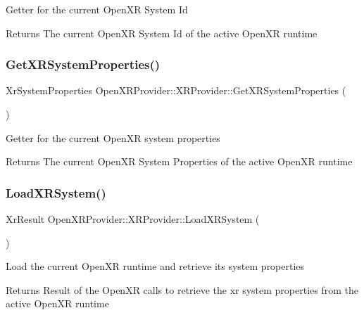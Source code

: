 Getter for the current Open\+XR System Id \begin{DoxyReturn}{Returns}
The current Open\+XR System Id of the active Open\+XR runtime 
\end{DoxyReturn}
\mbox{\label{class_open_x_r_provider_1_1_x_r_provider_aa5396c861be5f6a445095a8a346b62c9}} 
\subsubsection{\texorpdfstring{GetXRSystemProperties()}{GetXRSystemProperties()}}
{\footnotesize\ttfamily Xr\+System\+Properties Open\+X\+R\+Provider\+::\+X\+R\+Provider\+::\+Get\+X\+R\+System\+Properties (\begin{DoxyParamCaption}{ }\end{DoxyParamCaption})\hspace{0.3cm}{\ttfamily [inline]}}

Getter for the current Open\+XR system properties \begin{DoxyReturn}{Returns}
The current Open\+XR System Properties of the active Open\+XR runtime 
\end{DoxyReturn}
\mbox{\label{class_open_x_r_provider_1_1_x_r_provider_a1bd2735b39ea943cd9e436bb0650bc43}} 
\subsubsection{\texorpdfstring{LoadXRSystem()}{LoadXRSystem()}}
{\footnotesize\ttfamily Xr\+Result Open\+X\+R\+Provider\+::\+X\+R\+Provider\+::\+Load\+X\+R\+System (\begin{DoxyParamCaption}{ }\end{DoxyParamCaption})\hspace{0.3cm}{\ttfamily [private]}}

Load the current Open\+XR runtime and retrieve its system properties \begin{DoxyReturn}{Returns}
Result of the Open\+XR calls to retrieve the xr system properties from the active Open\+XR runtime 
\end{DoxyReturn}
\mbox{\label{class_open_x_r_provider_1_1_x_r_provider_a025a4e745f1381fb831ee41472491e25}} 
